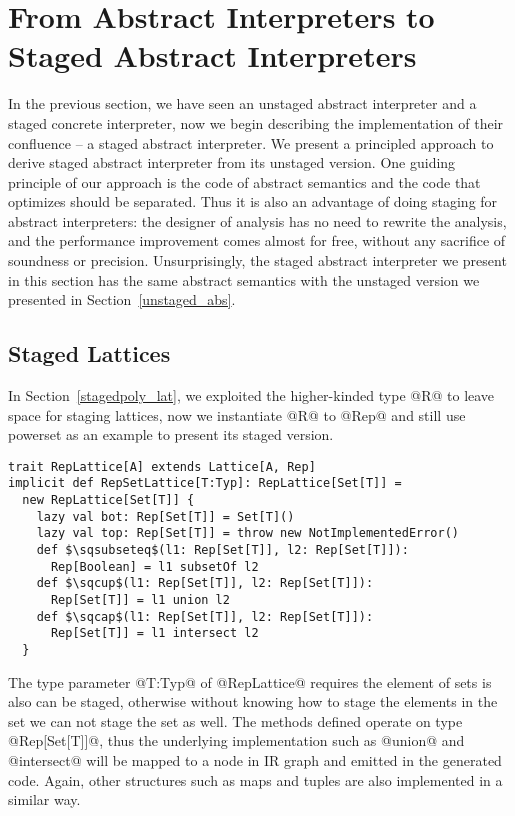 \section{From Abstract Interpreters to Staged Abstract Interpreters} \label{sai}

In the previous section, we have seen an unstaged abstract interpreter and a staged concrete interpreter, 
now we begin describing the implementation of their confluence -- a staged abstract interpreter. 
We present a principled approach to derive staged abstract interpreter
from its unstaged version. One guiding principle of our approach is the code of abstract semantics
and the code that optimizes should be separated. Thus it is also an advantage of doing staging 
for abstract interpreters: the designer of analysis has no need to rewrite the analysis, and 
the performance improvement comes almost for free, without any sacrifice of soundness or precision.
Unsurprisingly, the staged abstract interpreter we present in this section has the same abstract 
semantics with the unstaged version we presented in Section~\ref{unstaged_abs}.

\subsection{Staged Lattices} 
In Section~\ref{stagedpoly_lat}, we exploited the higher-kinded type @R@
to leave space for staging lattices, now we instantiate @R@ to @Rep@ and still use powerset as an 
example to present its staged version. 

\begin{lstlisting}
trait RepLattice[A] extends Lattice[A, Rep]
implicit def RepSetLattice[T:Typ]: RepLattice[Set[T]] = 
  new RepLattice[Set[T]] {
    lazy val bot: Rep[Set[T]] = Set[T]()
    lazy val top: Rep[Set[T]] = throw new NotImplementedError()
    def $\sqsubseteq$(l1: Rep[Set[T]], l2: Rep[Set[T]]): 
      Rep[Boolean] = l1 subsetOf l2
    def $\sqcup$(l1: Rep[Set[T]], l2: Rep[Set[T]]): 
      Rep[Set[T]] = l1 union l2
    def $\sqcap$(l1: Rep[Set[T]], l2: Rep[Set[T]]): 
      Rep[Set[T]] = l1 intersect l2
  }
\end{lstlisting}

The type parameter @T:Typ@ of @RepLattice@ requires the element of sets
is also can be staged, otherwise without knowing how to stage the elements in the set
we can not stage the set as well.
The methods defined operate on type @Rep[Set[T]]@, thus the underlying implementation
such as @union@ and @intersect@ will be mapped to a node in IR graph and emitted in 
the generated code. Again, other structures such as maps and tuples are also implemented
in a similar way.

